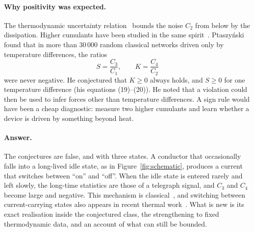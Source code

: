 \documentclass[11pt,a4paper]{article}
\theoremstyle{remark}\newtheorem{remark}[theorem]{Remark}
\begin{document}
\paragraph{Why positivity was expected.} The thermodynamic uncertainty relation~\cite{BaratoSeifert2015,Gingrich2016} bounds the noise $C_2$ from below by the dissipation. Higher cumulants have been studied in the same spirit~\cite{BaratoSeifert2015sk,WamplerBarato2022,Salazar2022}. Ptaszy\'nski~\cite{Ptaszynski2022} found that in more than $30\,000$ random classical networks driven only by temperature differences, the ratios
\begin{equation}\label{eq:ratios0}
S=\frac{C_3}{C_1},\qquad K=\frac{C_4}{C_2}
\end{equation}
were never negative. He conjectured that $K\ge0$ always holds, and $S\ge0$ for one temperature difference (his equations (19)--(20)). He noted that a violation could then be used to infer forces other than temperature differences. A sign rule would have been a cheap diagnostic: measure two higher cumulants and learn whether a device is driven by something beyond heat.

\paragraph{Answer.} The conjectures are false, and with three states. A conductor that occasionally falls into a long-lived idle state, as in Figure~\ref{fig:schematic}, produces a current that switches between ``on'' and ``off''. When the idle state is entered rarely and left slowly, the long-time statistics are those of a telegraph signal, and $C_3$ and $C_4$ become large and negative. This mechanism is classical~\cite{Jordan2004,BagretsNazarov2003}, and switching between current-carrying states also appears in recent thermal work~\cite{PtaszynskiEsposito2025}. What is new is its exact realisation inside the conjectured class, the strengthening to fixed thermodynamic data, and an account of what can still be bounded.
\end{document}

